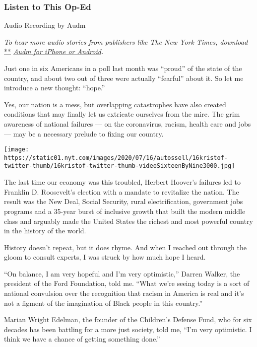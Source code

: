 \hypertarget{listen-to-this-op-ed}{%
\subsubsection{Listen to This Op-Ed}\label{listen-to-this-op-ed}}

Audio Recording by Audm

\emph{To hear more audio stories from publishers like The New York
Times, download}
\href{https://www.audm.com/?utm_source=nytmag\&utm_medium=embed\&utm_campaign=left_behind_draper}{**}
\href{https://www.audm.com/?utm_source=nytopinion\&utm_medium=embed\&utm_campaign=interrupt_gloom_hope}{\emph{Audm
for iPhone or Android}}\emph{.}

Just one in six Americans in a poll last month was ``proud'' of the
state of the country, and about two out of three were actually
``fearful'' about it. So let me introduce a new thought: ``hope.''

Yes, our nation is a mess, but overlapping catastrophes have also
created conditions that may finally let us extricate ourselves from the
mire. The grim awareness of national failures --- on the coronavirus,
racism, health care and jobs --- may be a necessary prelude to fixing
our country.

\texttt{[image: https://static01.nyt.com/images/2020/07/16/autossell/16kristof-twitter-thumb/16kristof-twitter-thumb-videoSixteenByNine3000.jpg]}

The last time our economy was this troubled, Herbert Hoover's failures
led to Franklin D. Roosevelt's election with a mandate to revitalize the
nation. The result was the New Deal, Social Security, rural
electrification, government jobs programs and a 35-year burst of
inclusive growth that built the modern middle class and arguably made
the United States the richest and most powerful country in the history
of the world.

History doesn't repeat, but it does rhyme. And when I reached out
through the gloom to consult experts, I was struck by how much hope I
heard.

``On balance, I am very hopeful and I'm very optimistic,'' Darren
Walker, the president of the Ford Foundation, told me. ``What we're
seeing today is a sort of national convulsion over the recognition that
racism in America is real and it's not a figment of the imagination of
Black people in this country.''

Marian Wright Edelman, the founder of the Children's Defense Fund, who
for six decades has been battling for a more just society, told me,
``I'm very optimistic. I think we have a chance of getting something
done.''

